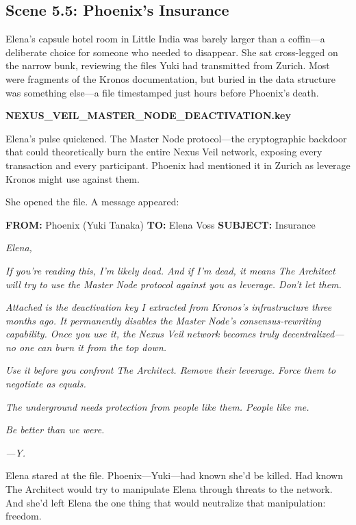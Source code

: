 \hypertarget{scene-5.5-phoenixs-insurance}{%
\subsection{Scene 5.5: Phoenix's Insurance}\label{scene-5.5-phoenixs-insurance}}

Elena's capsule hotel room in Little India was barely larger than a coffin---a deliberate choice for someone who needed to disappear. She sat cross-legged on the narrow bunk, reviewing the files Yuki had transmitted from Zurich. Most were fragments of the Kronos documentation, but buried in the data structure was something else---a file timestamped just hours before Phoenix's death.

\textbf{NEXUS\_VEIL\_MASTER\_NODE\_DEACTIVATION.key}

Elena's pulse quickened. The Master Node protocol---the cryptographic backdoor that could theoretically burn the entire Nexus Veil network, exposing every transaction and every participant. Phoenix had mentioned it in Zurich as leverage Kronos might use against them.

She opened the file. A message appeared:

\textbf{FROM:} Phoenix (Yuki Tanaka) \textbf{TO:} Elena Voss \textbf{SUBJECT:} Insurance

\emph{Elena,}

\emph{If you're reading this, I'm likely dead. And if I'm dead, it means The Architect will try to use the Master Node protocol against you as leverage. Don't let them.}

\emph{Attached is the deactivation key I extracted from Kronos's infrastructure three months ago. It permanently disables the Master Node's consensus-rewriting capability. Once you use it, the Nexus Veil network becomes truly decentralized---no one can burn it from the top down.}

\emph{Use it before you confront The Architect. Remove their leverage. Force them to negotiate as equals.}

\emph{The underground needs protection from people like them. People like me.}

\emph{Be better than we were.}

\emph{---Y.}

Elena stared at the file. Phoenix---Yuki---had known she'd be killed. Had known The Architect would try to manipulate Elena through threats to the network. And she'd left Elena the one thing that would neutralize that manipulation: freedom.

